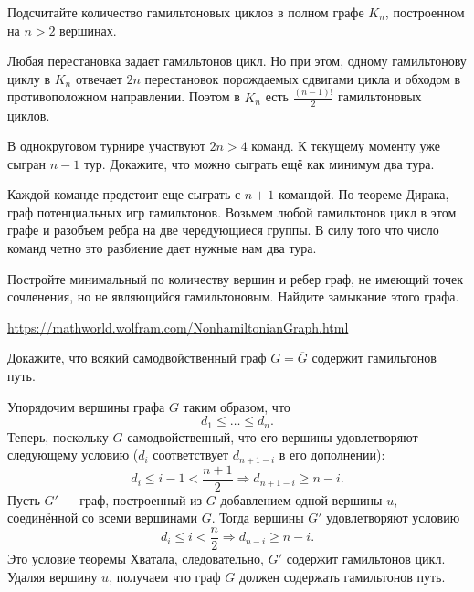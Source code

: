 \documentclass[a4paper,12pt,twoside]{article}
\begin{document}
\begin{?}
    Подсчитайте количество гамильтоновых циклов в полном графе $K_n$, построенном на $n > 2$ вершинах.
\end{?}
\begin{solution}{}
    Любая перестановка задает гамильтонов цикл. Но при этом, одному гамильтонову циклу в \(K_n\) отвечает \(2n\) перестановок порождаемых сдвигами цикла и обходом в противоположном направлении. Поэтом в \(K_n\) есть \(\frac{(n-1)!}{2}\) гамильтоновых циклов.
\end{solution}
\begin{?}
    В однокруговом турнире участвуют $2n > 4$ команд. К текущему моменту уже сыгран $n - 1$ тур. Докажите, что можно сыграть ещё как минимум два тура.
\end{?}
\begin{solution}{}
    Каждой команде предстоит еще сыграть с \(n+1\) командой. По теореме Дирака, граф потенциальных игр гамильтонов. Возьмем любой гамильтонов цикл в этом графе и разобъем ребра на две чередующиеся группы. В силу того что число команд четно это разбиение дает нужные нам два тура.
\end{solution}
\begin{?}
    Постройте минимальный по количеству вершин и ребер граф, не имеющий точек сочленения, но не являющийся гамильтоновым. Найдите замыкание этого графа.
\end{?}
\begin{solution}{}
    \url{https://mathworld.wolfram.com/NonhamiltonianGraph.html}
\end{solution}
\begin{?}
    Докажите, что всякий самодвойственный граф \(G = \overline{G}\) содержит гамильтонов путь.
\end{?}
\begin{solution}{}
    Упорядочим вершины графа \(G\) таким образом, что
    \[
        d_{1} \leq \ldots \leq d_{n}.
    \]
    Теперь, поскольку \(G\) самодвойственный, что его вершины удовлетворяют следующему условию (\(d_{i}\) соответствует \(d_{n+1-i}\) в его дополнении):
    \[
        d_{i} \leq i - 1 < \frac{n + 1}{2} \Rightarrow d_{n + 1 - i} \geq n - i.
    \]
    Пусть \(G'\) --- граф, построенный из \(G\) добавлением одной вершины \(u\), соединённой со всеми вершинами \(G\). Тогда вершины \(G'\) удовлетворяют условию
    \[
        d_{i} \leq i < \frac{n}{2} \Rightarrow d_{n - i} \geq n - i.
    \]
    Это условие теоремы Хватала, следовательно, \(G'\) содержит гамильтонов цикл. Удаляя вершину \(u\), получаем что граф \(G\) должен содержать гамильтонов путь.
\end{solution}
\end{document}
